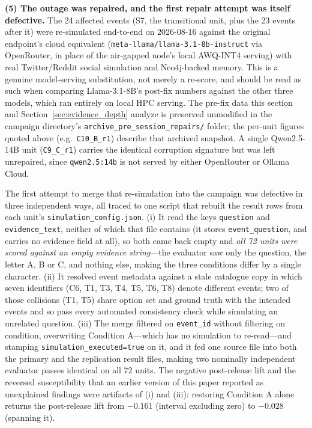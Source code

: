 \documentclass[11pt,journal,onecolumn]{IEEEtran}
\begin{document}
\textbf{(5) The outage was repaired, and the first repair attempt was itself defective.} The 24 affected events (S7, the transitional unit, plus the 23 events after it) were re-simulated end-to-end on 2026-08-16 against the original endpoint's cloud equivalent (\texttt{meta-llama/llama-3.1-8b-instruct} via OpenRouter, in place of the air-gapped node's local AWQ-INT4 serving) with real Twitter/Reddit social simulation and Neo4j-backed memory. This is a genuine model-serving substitution, not merely a re-score, and should be read as such when comparing Llama-3.1-8B's post-fix numbers against the other three models, which ran entirely on local HPC serving. The pre-fix data this section and Section~\ref{sec:evidence_depth} analyze is preserved unmodified in the campaign directory's \texttt{archive\_pre\_session\_repairs/} folder; the per-unit figures quoted above (e.g.\ \texttt{C10\_B\_r1}) describe that archived snapshot. A single Qwen2.5-14B unit (\texttt{C9\_C\_r1}) carries the identical corruption signature but was left unrepaired, since \texttt{qwen2.5:14b} is not served by either OpenRouter or Ollama Cloud.

The first attempt to merge that re-simulation into the campaign was defective in three independent ways, all traced to one script that rebuilt the result rows from each unit's \texttt{simulation\_config.json}. (i) It read the keys \texttt{question} and \texttt{evidence\_text}, neither of which that file contains (it stores \texttt{event\_question}, and carries no evidence field at all), so both came back empty and \emph{all 72 units were scored against an empty evidence string}---the evaluator saw only the question, the letter A, B or C, and nothing else, making the three conditions differ by a single character. (ii) It resolved event metadata against a stale catalogue copy in which seven identifiers (C6, T1, T3, T4, T5, T6, T8) denote different events; two of those collisions (T1, T5) share option set and ground truth with the intended events and so pass every automated consistency check while simulating an unrelated question. (iii) The merge filtered on \texttt{event\_id} without filtering on condition, overwriting Condition A---which has no simulation to re-read---and stamping \texttt{simulation\_executed=true} on it, and it fed one source file into both the primary and the replication result files, making two nominally independent evaluator passes identical on all 72 units. The negative post-release lift and the reversed susceptibility that an earlier version of this paper reported as unexplained findings were artifacts of (i) and (iii): restoring Condition A alone returns the post-release lift from $-0.161$ (interval excluding zero) to $-0.028$ (spanning it).
\end{document}

